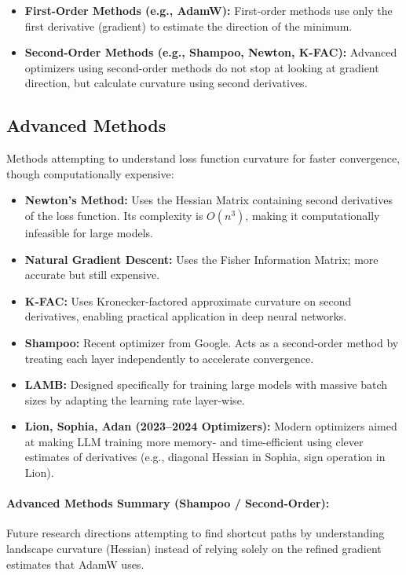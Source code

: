 \begin{itemize}
    \item \textbf{First-Order Methods (e.g., AdamW):} First-order methods use only the first derivative (gradient) to estimate the direction of the minimum.
    \item \textbf{Second-Order Methods (e.g., Shampoo, Newton, K-FAC):} Advanced optimizers using second-order methods do not stop at looking at gradient direction, but calculate curvature using second derivatives.
\end{itemize}

\subsection{Advanced Methods}

Methods attempting to understand loss function curvature for faster convergence, though computationally expensive:
\begin{itemize}
    \item \textbf{Newton's Method:} Uses the Hessian Matrix containing second derivatives of the loss function. Its complexity is $O(n^3)$, making it computationally infeasible for large models.
    \item \textbf{Natural Gradient Descent:} Uses the Fisher Information Matrix; more accurate but still expensive.
    \item \textbf{K-FAC:} Uses Kronecker-factored approximate curvature on second derivatives, enabling practical application in deep neural networks.
    \item \textbf{Shampoo:} Recent optimizer from Google. Acts as a second-order method by treating each layer independently to accelerate convergence.
    \item \textbf{LAMB:} Designed specifically for training large models with massive batch sizes by adapting the learning rate layer-wise.
    \item \textbf{Lion, Sophia, Adan (2023--2024 Optimizers):} Modern optimizers aimed at making LLM training more memory- and time-efficient using clever estimates of derivatives (e.g., diagonal Hessian in Sophia, sign operation in Lion).
\end{itemize}

\paragraph{Advanced Methods Summary (Shampoo / Second-Order):} Future research directions attempting to find shortcut paths by understanding landscape curvature (Hessian) instead of relying solely on the refined gradient estimates that AdamW uses.
